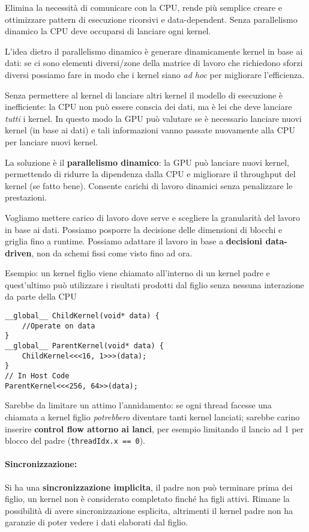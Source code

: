 Elimina la necessità di comunicare con la CPU, rende più semplice creare e ottimizzare pattern di esecuzione ricorsivi e data-dependent. Senza parallelismo dinamico la CPU deve occuparsi di lanciare ogni kernel.

L'idea dietro il parallelismo dinamico è generare dinamicamente kernel in base ai dati: se ci sono elementi diversi/zone della matrice di lavoro che richiedono sforzi diversi possiamo fare in modo che i kernel siano \textit{ad hoc} per migliorare l'efficienza.

Senza permettere al kernel di lanciare altri kernel il modello di esecuzione è inefficiente: la CPU non può essere conscia dei dati, ma è lei che deve lanciare \textit{tutti} i kernel. In questo modo la GPU può valutare se è necessario lanciare nuovi kernel (in base ai dati) e tali informazioni vanno passate nuovamente alla CPU per lanciare nuovi kernel.

La soluzione è il \textbf{parallelismo dinamico}: la GPU può lanciare nuovi kernel, permettendo di ridurre la dipendenza dalla CPU e migliorare il throughput del kernel (se fatto bene). Consente carichi di lavoro dinamici senza penalizzare le prestazioni.

Vogliamo mettere carico di lavoro dove serve e scegliere la granularità del lavoro in base ai dati. Possiamo posporre la decisione delle dimensioni di blocchi e griglia fino a runtime. Possiamo adattare il lavoro in base a \textbf{decisioni data-driven}, non da schemi fissi come visto fino ad ora.

Esempio: un kernel figlio viene chiamato all'interno di un kernel padre e quest'ultimo può utilizzare i risultati prodotti dal figlio senza nessuna interazione da parte della CPU
\begin{verbatim}
__global__ ChildKernel(void* data) {
    //Operate on data
}
__global__ ParentKernel(void* data) {
    ChildKernel<<<16, 1>>>(data);
}
// In Host Code
ParentKernel<<<256, 64>>(data);
\end{verbatim}

Sarebbe da limitare un attimo l'annidamento: se ogni thread facesse una chiamata a kernel figlio \textit{potrebbero} diventare tanti kernel lanciati; sarebbe carino inserire \textbf{control flow attorno ai lanci}, per esempio limitando il lancio ad 1 per blocco del padre (\texttt{threadIdx.x == 0}).

\paragraph{Sincronizzazione:} Si ha una \textbf{sincronizzazione implicita}, il padre non può terminare prima dei figlio, un kernel non è considerato completato finché ha figli attivi. Rimane la possibilità di avere sincronizzazione esplicita, altrimenti il kernel padre non ha garanzie di poter vedere i dati elaborati dal figlio.

